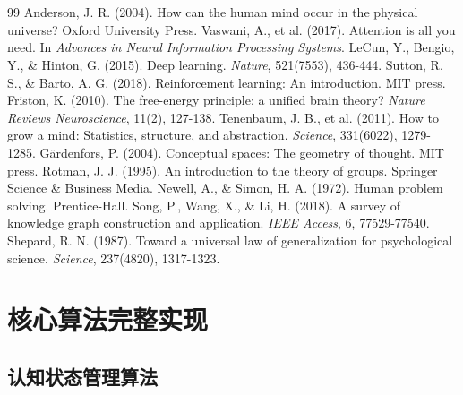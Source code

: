 \documentclass[12pt,a4paper]{article}
\begin{document}
\section*{}%
\begin{thebibliography}{99}
 Anderson, J. R. (2004). How can the human mind occur in the physical universe? Oxford University Press.
 Vaswani, A., et al. (2017). Attention is all you need. In \textit{Advances in Neural Information Processing Systems}.
 LeCun, Y., Bengio, Y., \& Hinton, G. (2015). Deep learning. \textit{Nature}, 521(7553), 436-444.
 Sutton, R. S., \& Barto, A. G. (2018). Reinforcement learning: An introduction. MIT press.
 Friston, K. (2010). The free-energy principle: a unified brain theory? \textit{Nature Reviews Neuroscience}, 11(2), 127-138.
 Tenenbaum, J. B., et al. (2011). How to grow a mind: Statistics, structure, and abstraction. \textit{Science}, 331(6022), 1279-1285.
 Gärdenfors, P. (2004). Conceptual spaces: The geometry of thought. MIT press.
 Rotman, J. J. (1995). An introduction to the theory of groups. Springer Science \& Business Media.
 Newell, A., \& Simon, H. A. (1972). Human problem solving. Prentice-Hall.
 Song, P., Wang, X., \& Li, H. (2018). A survey of knowledge graph construction and application. \textit{IEEE Access}, 6, 77529-77540.
 Shepard, R. N. (1987). Toward a universal law of generalization for psychological science. \textit{Science}, 237(4820), 1317-1323.
\end{thebibliography}

\appendix
\section{核心算法完整实现}

\subsection{认知状态管理算法}
\end{document}

